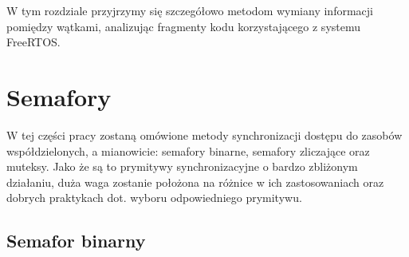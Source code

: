 W tym rozdziale przyjrzymy się szczegółowo metodom wymiany informacji pomiędzy wątkami,
analizując fragmenty kodu korzystającego z systemu FreeRTOS.

\section{Semafory}
W tej części pracy zostaną omówione metody synchronizacji dostępu do zasobów współdzielonych, a mianowicie: semafory binarne, semafory zliczające
oraz muteksy. Jako że są to prymitywy synchronizacyjne o bardzo zbliżonym działaniu, duża waga zostanie położona na różnice w ich zastosowaniach
oraz dobrych praktykach dot. wyboru odpowiedniego prymitywu.
\subsection{Semafor binarny}